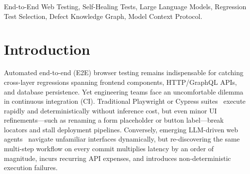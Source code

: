 \documentclass[conference]{IEEEtran}
\begin{document}
\begin{abstract}
Evaluated across two contrasting open-source full-stack applications (\texttt{cypress-realworld-app} in React/Express/GraphQL and \texttt{horilla} in Python/Django/HTMX), our system achieves \textbf{25/25 (100\%)} pass rate at \textbf{5.07\,s/run} vs.\ \textbf{11/15 (73.3\%, Fisher $p = 0.015$)} at \textbf{102.34\,s/run} for a fair Pure-LLM baseline (\textbf{20.2$\times$ speedup}, Mann-Whitney $U = 0$, $p < 0.001$, Cliff's $\delta = -1$, \textbf{98.5\%} cost reduction at $N = 100$). On our 48-commit fault-evolution benchmark (\texttt{EvoBench-48}), White-Box achieves \textbf{16/16 (100.0\%)} drift recovery vs.\ \textbf{50.0\%} for Black-Box (Exact McNemar $p = 0.0078$) while eliminating attempted oracle weakening (\textbf{0/20} vs.\ \textbf{12/20}, Fisher $p < 0.001$) and false healing (\textbf{0/20} vs.\ \textbf{1/20} live masked regression). Across three LLM families (\texttt{DeepSeek-V3.2}, \texttt{Gemini-2.5-Flash}, \texttt{GPT-4o-mini}), White-Box maintains \textbf{24/24 (100\%)} drift recovery and \textbf{0/12 (0\%)} false healing at \textbf{0} LLM calls on bugs. Finally, replaying \textbf{99} real upstream Git commits (\texttt{RealGit-99}, 0-LLM) skips \textbf{92.9\%} of commits and achieves \textbf{98.5\%} test reduction at \textbf{0.17--0.21\,ms/commit}.
\end{abstract}

\begin{IEEEkeywords}
End-to-End Web Testing, Self-Healing Tests, Large Language Models, Regression Test Selection, Defect Knowledge Graph, Model Context Protocol.
\end{IEEEkeywords}

\section{Introduction}
Automated end-to-end (E2E) browser testing remains indispensable for catching cross-layer regressions spanning frontend components, HTTP/GraphQL APIs, and database persistence. Yet engineering teams face an uncomfortable dilemma in continuous integration (CI). Traditional Playwright or Cypress suites~\cite{playwright2024} execute rapidly and deterministically without inference cost, but even minor UI refinements---such as renaming a form placeholder or button label---break locators and stall deployment pipelines. Conversely, emerging LLM-driven web agents~\cite{zhou2024webarena,deng2023mind2web,zheng2024seeact} navigate unfamiliar interfaces dynamically, but re-discovering the same multi-step workflow on every commit multiplies latency by an order of magnitude, incurs recurring API expenses, and introduces non-deterministic execution failures.
\end{document}
